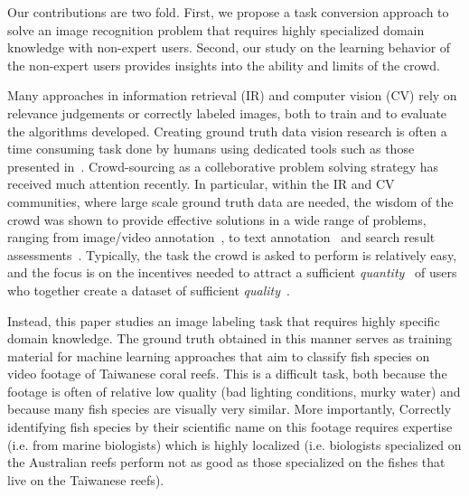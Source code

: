Our contributions are two fold. First, we propose a task conversion
approach to solve an image recognition problem that requires highly
specialized domain knowledge with non-expert users. Second, our study
on the learning behavior of the non-expert users provides insights
into the ability and limits of the crowd.  

Many approaches in information retrieval (IR) and computer vision (CV)
rely on relevance judgements or correctly labeled images, both to
train and to evaluate the algorithms developed. 
%
Creating ground truth data %
vision research is often a time consuming task done by humans using
dedicated  tools such as those presented in~\cite{Spam12:vigta}.
%
%
Crowd-sourcing as a colleborative problem solving strategy has
received much attention recently.
%
In particular, within the IR and CV communities, where large scale
ground truth data are needed, the wisdom of the crowd was shown to
provide effective solutions in a wide range of problems, ranging from
image/video annotation~\cite{Russell08:Label, Yuen09:Label, ahnl:04,
anhl06:impr, ahnl06:peekaboom, Chen:2011:LFA}, to text
annotation~\cite{AMBATI10.244, Finin:2010:ANE} and search result
assessments~\cite{eickhoff12:qual, Hoss12:aggr}. %
%
%
%
Typically, the task the crowd is asked to perform is relatively easy,
and the focus is on the incentives needed to attract a sufficient
\emph{quantity}~\cite{ahnl:04, Russell08:Label} of users who together
create a dataset of sufficient \emph{quality}~\cite{Kazai09onthe,
Kazai11crowd, quinn11:survey}. 

Instead, this paper studies an image labeling task that requires
highly specific domain knowledge. The ground truth obtained in this
manner serves as training material for machine learning approaches
that aim to classify fish species on video footage of Taiwanese coral
reefs.
%
This is a difficult task, both because the footage is often of
relative low quality (bad lighting conditions, murky water) and
because many fish species are visually very similar.  More 
importantly, 
Correctly identifying fish species by their scientific
name on this footage requires expertise (i.e. from marine biologists)
which is highly localized (i.e. biologists specialized on the
Australian reefs perform not as good as those specialized on the
fishes that live on the Taiwanese reefs). 

